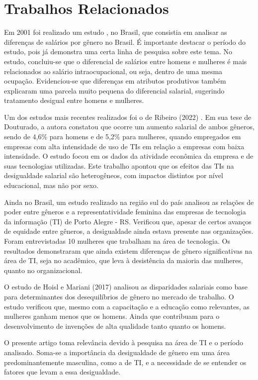 \section{Trabalhos Relacionados}

Em 2001 foi realizado um estudo \cite{araujo2001diferenciais}, no Brasil, que consistia em analisar as diferenças de salários por gênero no Brasil. É importante destacar o período do estudo, pois já demonstra uma certa linha de pesquisa sobre este tema. No estudo, concluiu-se que o diferencial de salários entre homens e mulheres é mais relacionados ao salário intraocupacional, ou seja, dentro de uma mesma ocupação. Evidenciou-se que diferenças em atributos produtivos também explicaram uma parcela muito pequena do diferencial salarial, sugerindo tratamento desigual entre homens e mulheres. 

Um dos estudos mais recentes realizados foi o de Ribeiro (2022) \cite{ribeiro2022efeitos}. Em sua tese de Douturado, a autora constatou que ocorre um aumento salarial de ambos gêneros,
sendo de 4,6\% para homens e de 5,2\% para mulheres, quando empregados em empresas com
alta intensidade de uso de TIs em relação a empresas com baixa intensidade. O estudo focou em os dados da atividade econômica da empresa e de suas tecnologias utilizadas. Este trabalho apontou que os efeitos das TIs na desigualdade salarial são heterogêneos, com impactos distintos por nível educacional, mas não por sexo. 

Ainda no Brasil, um estudo realizado na região sul do país \cite{camargo2019relaccoes} analisou as relações de poder entre gêneros e a representatividade feminina das empresas de tecnologia da informação (TI) de Porto Alegre - RS. Verificou que, apesar de certos avanços de equidade entre gêneros, a desigualdade ainda estava presente nas organizações. Foram entrevistadas 10 mulheres que trabalham na área de tecnologia. Os resultados demonstraram que ainda existem diferenças de gênero significativas na área de TI, seja no acadêmico, que leva à desistência da maioria das mulheres, quanto no organizacional. 

O estudo de Hoisl e Mariani (2017) \cite{hoisl2017sa} analisou as disparidades salariais como base para determinantes dos desequilíbrios de gênero no mercado de trabalho. O estudo verificou que, mesmo com a capacitação e a educação como relevantes, as mulheres ganham menos que os homens. Ainda que contribuam para o desenvolvimento de invenções de alta qualidade tanto quanto os homens.

O presente artigo toma relevância devido à pesquisa na área de TI e o período analisado. Soma-se a importância da desigualdade de gênero em uma área predominantemente masculina, como a de TI, e a necessidade de se entender os fatores que levam a essa desigualdade.

